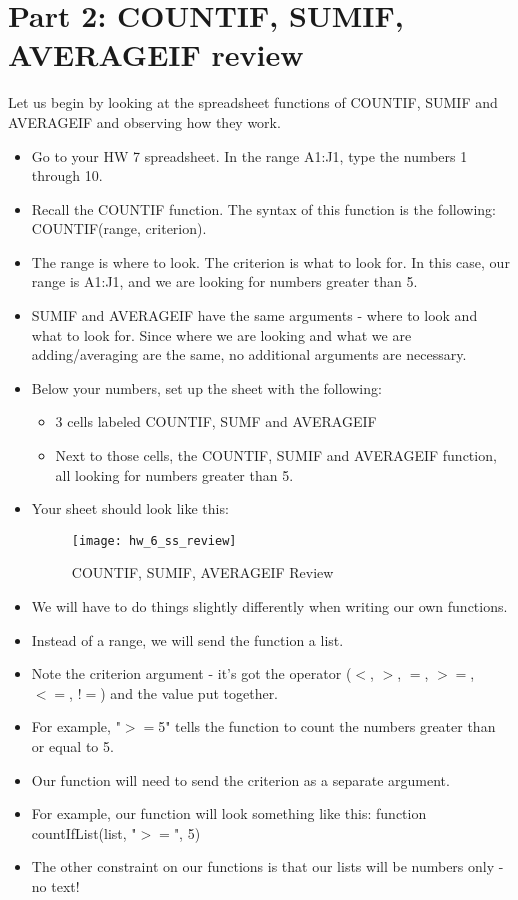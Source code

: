 \documentclass{article}
\begin{document}
\section*{Part 2: COUNTIF, SUMIF, AVERAGEIF review}
Let us begin by looking at the spreadsheet functions of COUNTIF, SUMIF and AVERAGEIF and observing how they work.
\begin{itemize}
    \item Go to your HW 7 spreadsheet.  In the range A1:J1, type the numbers 1 through 10.
    \item Recall the COUNTIF function.  The syntax of this function is the following:  COUNTIF(range, criterion).
    \item The range is where to look.  The criterion is what to look for.  In this case, our range is A1:J1, and we are looking for numbers greater than 5.
    \item SUMIF and AVERAGEIF have the same arguments - where to look and what to look for.  Since where we are looking and what we are adding/averaging are the same, no additional arguments are necessary.
    \item Below your numbers, set up the sheet with the following:
    \begin{itemize}
    		\item 3 cells labeled COUNTIF, SUMF and AVERAGEIF
    		\item Next to those cells, the COUNTIF, SUMIF and AVERAGEIF function, all looking for numbers greater than 5.
    	\end{itemize}
    	\item Your sheet should look like this:
    	\begin{figure}[H]
  		\centering
  		\texttt{[image: hw\_6\_ss\_review]}
  		\caption{COUNTIF, SUMIF, AVERAGEIF Review}
	\end{figure}
	\item We will have to do things slightly differently when writing our own functions.
	\item Instead of a range, we will send the function a list. 
	\item Note the criterion argument - it's got the operator ($<$, $>$, $=$, $>=$, $<=$, $!=$) and the value put together.
	\item For example, "$>=$5" tells the function to count the numbers greater than or equal to 5.
	\item Our function will need to send the criterion as a separate argument.  
	\item For example, our function will look something like this:  function countIfList(list, "$>=$", 5)
	\item The other constraint on our functions is that our lists will be numbers only - no text!
\end{itemize}
\end{document}
